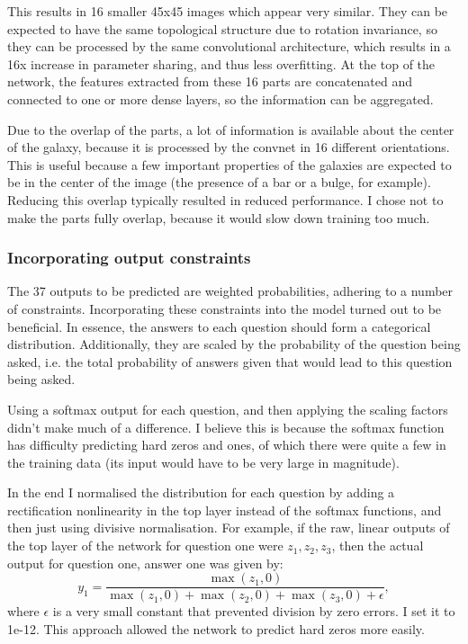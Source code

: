 \documentclass[a4paper,10pt]{article}
\begin{document}
This results in 16 smaller 45x45 images which appear very similar. They can be expected to have the same topological structure due to rotation invariance, so they can be processed by the same convolutional architecture, which results in a 16x increase in parameter sharing, and thus less overfitting. At the top of the network, the features extracted from these 16 parts are concatenated and connected to one or more dense layers, so the information can be aggregated.
 
Due to the overlap of the parts, a lot of information is available about the center of the galaxy, because it is processed by the convnet in 16 different orientations. This is useful because a few important properties of the galaxies are expected to be in the center of the image (the presence of a bar or a bulge, for example). Reducing this overlap typically resulted in reduced performance. I chose not to make the parts fully overlap, because it would slow down training too much.

\subsubsection{Incorporating output constraints}
\label{sec:output-constraints}
The 37 outputs to be predicted are weighted probabilities, adhering to a number of constraints. Incorporating these constraints into the model turned out to be beneficial. In essence, the answers to each question should form a categorical distribution. Additionally, they are scaled by the probability of the question being asked, i.e. the total probability of answers given that would lead to this question being asked.

Using a softmax output for each question, and then applying the scaling factors didn't make much of a difference. I believe this is because the softmax function has difficulty predicting hard zeros and ones, of which there were quite a few in the training data (its input would have to be very large in magnitude).

In the end I normalised the distribution for each question by adding a rectification nonlinearity in the top layer instead of the softmax functions, and then just using divisive normalisation. For example, if the raw, linear outputs of the top layer of the network for question one were $z_1, z_2, z_3$, then the actual output for question one, answer one was given by:
\begin{equation}
y_1 = \dfrac{\max(z_1, 0)}{\max(z_1, 0) + \max(z_2, 0) + \max(z_3, 0) + \epsilon},
\end{equation}
where $\epsilon$ is a very small constant that prevented division by zero errors. I set it to 1e-12. This approach allowed the network to predict hard zeros more easily.
\end{document}
